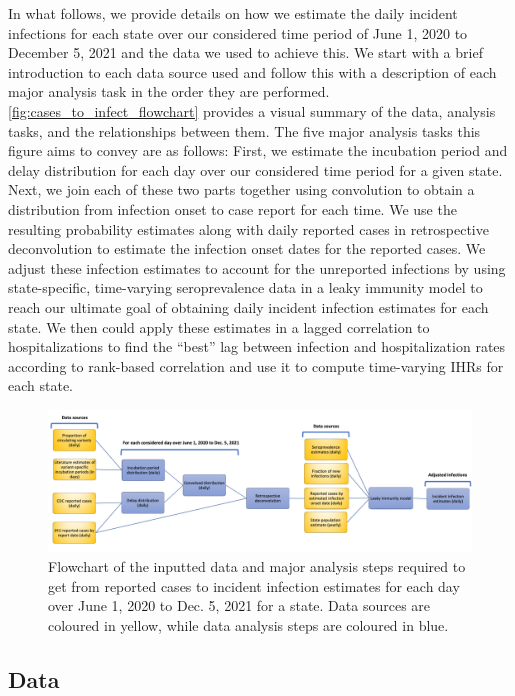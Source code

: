 \documentclass{article}
\begin{document}
In what follows, we provide details on how we estimate the daily incident infections for each state over our considered time period of June 1, 2020 to December 5, 2021 and the data we used to achieve this. We start with a brief introduction to each data source used and follow this with a description of each major analysis task in the order they are performed. \autoref{fig:cases_to_infect_flowchart} provides a visual summary of the data, analysis tasks, and the relationships between them. The five major analysis tasks this figure aims to convey are as follows: First, we estimate the incubation period and delay distribution for each day over our considered time period for a given state. Next, we join each of these two parts together using convolution to obtain a distribution from infection onset to case report for each time. We use the resulting probability estimates along with daily reported cases in retrospective deconvolution to estimate the infection onset dates for the reported cases. We adjust these infection estimates to account for the unreported infections by using state-specific, time-varying seroprevalence data in a leaky immunity model to reach our ultimate goal of obtaining daily incident infection estimates for each state. We then could apply these estimates in a lagged correlation to hospitalizations to find the ``best'' lag between infection and hospitalization rates according to rank-based correlation and use it to compute time-varying IHRs for each state. 


\begin{figure}[!tb]
\centering
    \includegraphics[width=.99\textwidth]{Reported_cases_to_infect_flowchart.pdf} 
    \caption{Flowchart of the inputted data and major analysis steps required to get from reported cases to incident infection estimates for each day over June 1, 2020 to Dec. 5, 2021 for a state. Data sources are coloured in yellow, while data analysis steps are coloured in blue.}
    \label{fig:cases_to_infect_flowchart}
\end{figure}


\subsection{Data} 
\end{document}
